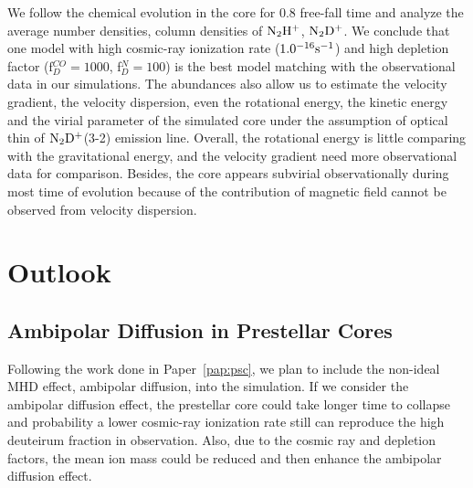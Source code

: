 We follow the chemical evolution in the core for 0.8 free-fall time and analyze the average number densities, column densities of $\rm N_2H^+$, $\rm N_2D^+$. We conclude that one model with high cosmic-ray ionization rate ($1.0 \time 10^{-16} \rm s^{-1}$) and high depletion factor (f$_D^{CO} = 1000$, f$_D^N = 100$) is the best model matching with the observational data in our simulations. The abundances also allow us to estimate the velocity gradient, the velocity dispersion, even the rotational energy, the kinetic energy and the virial parameter of the simulated core under the assumption of optical thin of $\rm N_2D^+$(3-2) emission line. Overall, the rotational energy is little comparing with the gravitational energy, and the velocity gradient need more observational data for comparison. Besides, the core appears subvirial observationally during most time of evolution because of the contribution of magnetic field cannot be observed from velocity dispersion.



%
\chapter{Outlook}

\section{Ambipolar Diffusion in Prestellar Cores}
Following the work done in Paper~\ref{pap:psc}, we plan to include the non-ideal MHD effect, ambipolar diffusion, into the simulation. If we consider the ambipolar diffusion effect, the prestellar core could take longer time to collapse and probability a lower cosmic-ray ionization rate still can reproduce the high deuteirum fraction in observation. Also, due to the cosmic ray and depletion factors, the mean ion mass could be reduced and then enhance the ambipolar diffusion effect. 

